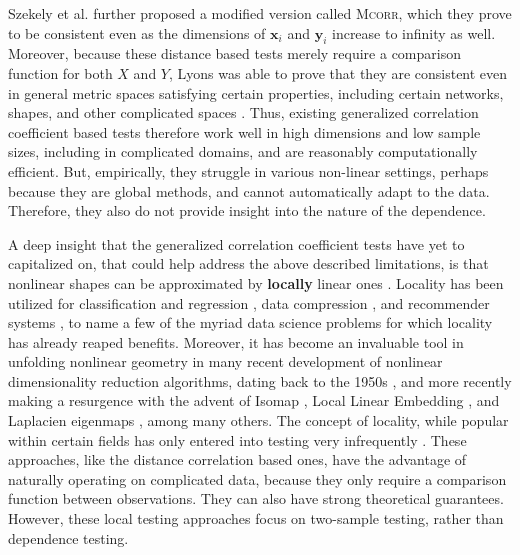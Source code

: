 \documentclass[11pt]{article}
\providecommand{\sct}[1]{{\normalfont\textsc{#1}}}
\providecommand{\mb}[1]{\boldsymbol{#1}}
\newcommand{\Dcorr}{\sct{Dcorr}}
\newcommand{\Mcorr}{\sct{Mcorr}}
\begin{document}
Szekely et al. \cite{SzekelyRizzo2013a} further proposed a modified version called \Mcorr, which they prove to be consistent even as the dimensions of $\mb{x}_i$ and $\mb{y}_i$ increase to infinity as well.
Moreover, because these distance based tests merely require a comparison function for both $X$ and $Y$, Lyons was able to prove that they are consistent even in general metric spaces satisfying certain properties, including certain networks, shapes, and other complicated spaces  \cite{Lyons2013}.
% 
Thus, existing generalized correlation coefficient based tests therefore work well in high dimensions and low sample sizes, including in complicated domains, and are reasonably computationally efficient. But, empirically, they struggle in various non-linear settings, perhaps because they are global methods, and cannot  automatically adapt to the data.  Therefore, they also do not provide insight into the nature of the dependence.


A deep insight that the generalized correlation coefficient tests  have yet to capitalized on, %
that could help address the above described limitations, 
is that nonlinear shapes can be approximated by \textbf{locally} linear ones \cite{Allard2012}.  Locality has been utilized for classification and regression  \cite{Stone1977}, data compression \cite{DaubechiesWaveletBook}, and recommender systems \cite{Sarwar2000}, to name a few of the myriad data science problems for which locality has already reaped benefits.
Moreover, it has become an invaluable tool in unfolding nonlinear geometry in many recent development of nonlinear dimensionality reduction algorithms, dating back to the 1950s \cite{TorgersonBook}, and more recently making a resurgence with the advent of  Isomap \cite{TenenbaumSilvaLangford2000, SilvaTenenbaum2003}, Local Linear Embedding \cite{SaulRoweis2000, RoweisSaul2003}, and Laplacien eigenmaps \cite{BelkinNiyogi2003}, among many others. The concept of locality, while popular within certain fields has only entered into  testing very infrequently
\cite{David1966,Friedman1983,Schilling1986}.  These approaches, like the distance correlation based ones, have the advantage of naturally operating on complicated data, because they only require a comparison function between observations.  They can also have strong theoretical guarantees. 
However, these local testing approaches focus on two-sample testing, rather than dependence testing. 
\end{document}

